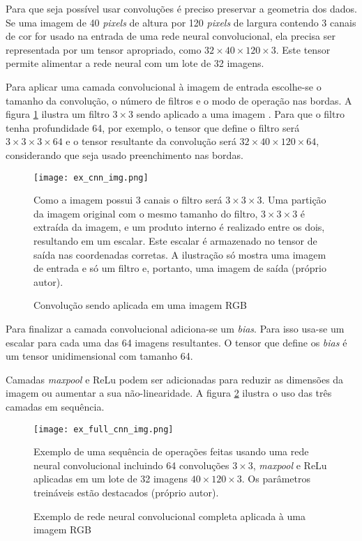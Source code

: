 Para que seja possível usar convoluções é preciso preservar a
geometria dos dados. Se uma imagem de 40
\emph{pixels} de altura por 120 \emph{pixels} de largura contendo 3 canais de
cor for usado na
entrada de uma rede neural convolucional, ela precisa ser representada por um
tensor apropriado, como $32 \times 40 \times 120 \times 3$. Este tensor
permite alimentar a rede neural com um lote de 32 imagens.

Para aplicar uma camada convolucional à imagem de entrada escolhe-se o tamanho
da convolução, o número de filtros e o modo de operação nas bordas. A figura
\ref{fig:ex_cnn_img} ilustra um filtro $3 \times 3$ sendo aplicado a uma imagem
.
Para que o filtro tenha profundidade 64, por exemplo, o tensor que define o
filtro será $3 \times 3 \times 3 \times 64$ e o tensor resultante da
convolução será $32 \times 40 \times 120 \times 64$,
considerando que seja usado preenchimento nas bordas.

\begin{figure}[!htb]
	\centering
	\texttt{[image: ex\_cnn\_img.png]}
	\caption{Convolução sendo aplicada em uma imagem RGB}
	\label{fig:ex_cnn_img}
	Como a imagem possui 3 canais o filtro será $3 \times 3 \times 3$.
	Uma partição da imagem original com o mesmo tamanho do filtro,
	$3 \times 3 \times 3$ é extraída da imagem, e um
	produto interno é realizado entre os dois, resultando em um escalar. Este
	escalar é armazenado no tensor de saída nas coordenadas corretas. A
	ilustração só mostra uma imagem de entrada e só um filtro e, portanto, uma
	imagem de saída (próprio autor).
\end{figure}

Para finalizar a camada convolucional adiciona-se um \emph{bias}. Para
isso usa-se um escalar para cada uma das 64 imagens resultantes. O
tensor que define os \emph{bias} é um tensor unidimensional com tamanho 64.

Camadas \emph{maxpool} e ReLu podem ser adicionadas para reduzir as
dimensões da imagem ou aumentar a sua não-linearidade. A figura
\ref{fig:ex_full_cnn_img} ilustra o uso das três camadas em sequência.

\begin{figure}[!htb]
	\centering
	\texttt{[image: ex\_full\_cnn\_img.png]}
	\caption{Exemplo de rede neural convolucional completa aplicada à uma imagem
		RGB}
	\label{fig:ex_full_cnn_img}
	Exemplo de uma sequência de operações feitas usando uma rede neural
	convolucional incluindo 64 convoluções $3 \times 3$, \emph{maxpool} e
	ReLu aplicadas em um
	lote de 32 imagens $40 \times 120 \times 3$. Os parâmetros treináveis
	estão destacados (próprio autor).
\end{figure}

